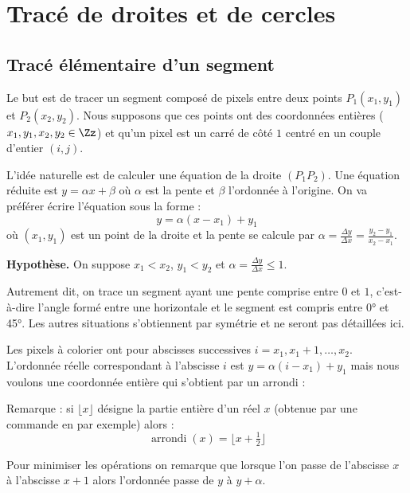 \documentclass[11pt,class=report,crop=false]{standalone}
\begin{document}
\section{Tracé de droites et de cercles}

\subsection{Tracé élémentaire d'un segment}

Le but est de tracer un segment composé de pixels entre deux points $P_1(x_1,y_1)$ et $P_2(x_2,y_2)$. Nous supposons que ces points ont des coordonnées entières ($x_1, y_1, x_2, y_2 \in \Zz$) et qu'un pixel est un carré de côté 
$1$ centré en un couple d'entier $(i,j)$.


L'idée naturelle est de calculer une équation de la droite $(P_1P_2)$. Une équation réduite est $y = \alpha x + \beta$ où $\alpha$ est la pente et $\beta$ l'ordonnée à l'origine.
On va préférer écrire l'équation sous la forme :
$$y = \alpha (x-x_1) + y_1$$
où $(x_1,y_1)$ est un point de la droite et la pente se calcule par 
$\alpha = \frac{\Delta y}{\Delta x} = \frac{y_2-y_1}{x_2-x_1}.$

\textbf{Hypothèse.} On suppose $x_1 < x_2$,  $y_1 < y_2$ et $\alpha = \frac{\Delta y}{\Delta x} \le 1$.

Autrement dit, on trace un segment ayant une pente comprise entre $0$ et $1$, c'est-à-dire l'angle formé entre une horizontale et le segment est compris entre \ang{0} et \ang{45}.
Les autres situations s'obtiennent par symétrie et ne seront pas détaillées ici.

Les pixels à colorier ont pour abscisses successives $i=x_1, x_1+1,\ldots,x_2$.
L'ordonnée réelle correspondant à l'abscisse $i$ est $y = \alpha (i-x_1) + y_1$ mais nous voulons une coordonnée entière qui s'obtient par un arrondi :

Remarque :
si $\lfloor x \rfloor$ désigne la partie entière d'un réel $x$ (obtenue par une commande  en \Python{} par exemple) alors :
$$\operatorname{arrondi}(x) = \lfloor x + \tfrac12 \rfloor$$


Pour minimiser les opérations on remarque que lorsque l'on passe de l'abscisse $x$ à l'abscisse $x+1$ alors l'ordonnée passe de $y$ à $y + \alpha$.
\end{document}
